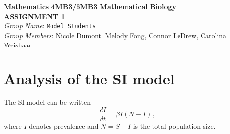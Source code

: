\documentclass[12pt]{article}
\begin{document}
\begin{center}
{\bfseries Mathematics 4MB3/6MB3 Mathematical Biology\\
 ASSIGNMENT {\color{blue}1}}\\
\medskip
\underline{\emph{Group Name}}: \texttt{{\color{blue}Model Students}}\\
\medskip
\underline{\emph{Group Members}}: {\color{blue}Nicole Dumont, Melody Fong, Connor LeDrew, Carolina Weishaar}
\end{center}

\section{Analysis of the SI model}

The SI model can be written
%
\begin{equation}\label{E:SI}
  \frac{dI}{dt} = \beta I(N - I) \,,
\end{equation}
%
where $I$ denotes prevalence and $N=S+I$ is the total population size.
\end{document}
